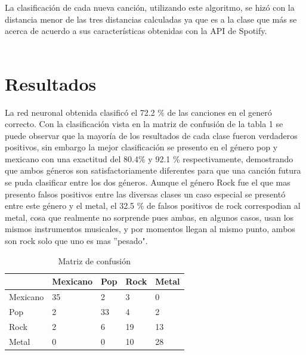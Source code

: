 \documentclass[conference]{IEEEtran}
\begin{document}
La clasificación de cada nueva canción, utilizando este algoritmo, se hizó con la distancia menor de las tres distancias calculadas ya que es a la clase que más se acerca de acuerdo a sus características obtenidas con la API de Spotify.\\\\

\section{Resultados}

La red neuronal obtenida clasificó el 72.2 \% de las canciones en el generó correcto. Con la clasificación vista en la matriz de confusión de la tabla 1 se puede observar que la mayoría de los resultados de cada clase fueron verdaderos positivos, sin embargo la mejor clasificación se presento en el género pop y mexicano con una exactitud del 80.4\% y 92.1 \% respectivamente, demostrando que  ambos géneros son satisfactoriamente diferentes para que una canción futura se puda clasificar entre los dos géneros. Aunque el género Rock fue el que mas presento falsos positivos entre las diversas clases un caso especial se presentó entre este género y el metal, el 32.5 \% de falsos positivos de rock correspodian al metal, cosa que realmente no sorprende pues ambas, en algunos casos, usan los mismos instrumentos musicales, y por momentos llegan al mismo punto, ambos son rock solo que uno es mas ''pesado". 
 

\begin{table}[h]
	\renewcommand{\tablename}{Tabla}
	\centering
	\caption{Matriz de confusión}
	\label{my-label}
	\begin{tabular}{l|l|l|l|l|}
	\cline{2-5}
							& Mexicano  & Pop & Rock & Metal \\ \hline
	\multicolumn{1}{|l|}{Mexicano} & 35 & 2  & 3  & 0  \\ \hline
	\multicolumn{1}{|l|}{Pop} &  2  & 33  & 4  &  2 \\ \hline
	\multicolumn{1}{|l|}{Rock} &  2  &  6 &  19 & 13  \\ \hline
	\multicolumn{1}{|l|}{Metal} &  0  & 0  & 10  & 28  \\ \hline
	\end{tabular}
	\end{table}
\end{document}
